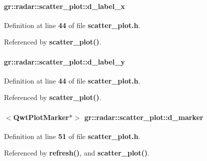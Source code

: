 \paragraph[{d\+\_\+label\+\_\+x}]{ gr\+::radar\+::scatter\+\_\+plot\+::d\+\_\+label\+\_\+x\hspace{0.3cm}{\ttfamily [private]}}\label{classgr_1_1radar_1_1scatter__plot_ae38119e8a3fe8324be39dcb04e3d1dcc}


Definition at line {\bf 44} of file {\bf scatter\+\_\+plot.\+h}.



Referenced by {\bf scatter\+\_\+plot()}.

\paragraph[{d\+\_\+label\+\_\+y}]{ gr\+::radar\+::scatter\+\_\+plot\+::d\+\_\+label\+\_\+y\hspace{0.3cm}{\ttfamily [private]}}\label{classgr_1_1radar_1_1scatter__plot_ae52c1fe6667f2561da5621b6219775f5}


Definition at line {\bf 44} of file {\bf scatter\+\_\+plot.\+h}.



Referenced by {\bf scatter\+\_\+plot()}.

\paragraph[{d\+\_\+marker}]{$<$Qwt\+Plot\+Marker$\ast$$>$ gr\+::radar\+::scatter\+\_\+plot\+::d\+\_\+marker\hspace{0.3cm}{\ttfamily [private]}}\label{classgr_1_1radar_1_1scatter__plot_ac63394ca2de9311c74665068ca2cf040}


Definition at line {\bf 51} of file {\bf scatter\+\_\+plot.\+h}.



Referenced by {\bf refresh()}, and {\bf scatter\+\_\+plot()}.

